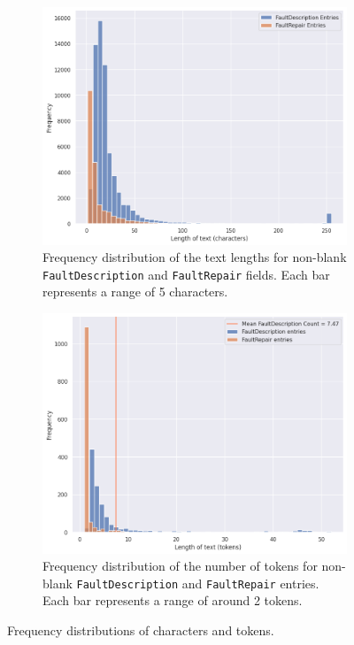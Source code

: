 \documentclass[10pt,oneside]{report}
\begin{document}
\begin{figure}[htbp]
    \centering
    \begin{subfigure}[b]{0.48\textwidth}
        \centering
        \includegraphics[width=\textwidth]{FaultDescriptionVSFaultRepairs.png}
        \caption{Frequency distribution of the text lengths for non-blank \texttt{FaultDescription} and \texttt{FaultRepair} fields. Each bar represents a range of 5 characters.}\label{fig:FaultDescriptionVSFaultRepairs}
    \end{subfigure}
    \hfill
    \begin{subfigure}[b]{0.48\textwidth}
        \centering
        \includegraphics[width=\textwidth]{./images/ionSourceTokenCountDist.png}
        \caption{Frequency distribution of the number of tokens for non-blank \texttt{FaultDescription} and \texttt{FaultRepair} entries. Each bar represents a range of around 2 tokens.}\label{fig:ionSourceTokenCountDist}
    \end{subfigure}
    \caption{Frequency distributions of characters and tokens.}
    \label{fig:hists}
\end{figure}
\end{document}
